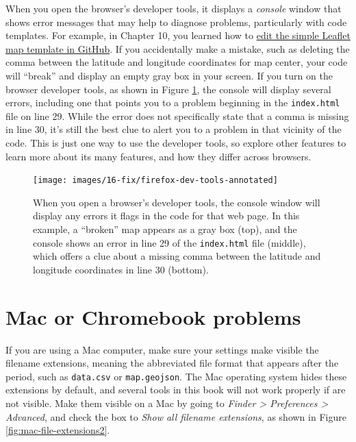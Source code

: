 \documentclass[
  english,
]{book}
\begin{document}
When you open the browser's developer tools, it displays a \emph{console} window that shows error messages that may help to diagnose problems, particularly with code templates. For example, in Chapter 10, you learned how to \href{copy-leaflet.html}{edit the simple Leaflet map template in GitHub}. If you accidentally make a mistake, such as deleting the comma between the latitude and longitude coordinates for map center, your code will ``break'' and display an empty gray box in your screen. If you turn on the browser developer tools, as shown in Figure \ref{fig:firefox-dev-tools}, the console will display several errors, including one that points you to a problem beginning in the \texttt{index.html} file on line 29. While the error does not specifically state that a comma is missing in line 30, it's still the best clue to alert you to a problem in that vicinity of the code. This is just one way to use the developer tools, so explore other features to learn more about its many features, and how they differ across browsers.



\begin{figure}
\texttt{[image: images/16-fix/firefox-dev-tools-annotated]} \caption{When you open a browser's developer tools, the console window will display any errors it flags in the code for that web page. In this example, a ``broken'' map appears as a gray box (top), and the console shows an error in line 29 of the \texttt{index.html} file (middle), which offers a clue about a missing comma between the latitude and longitude coordinates in line 30 (bottom).}\label{fig:firefox-dev-tools}
\end{figure}

\hypertarget{fix-computer}{%
\section{Mac or Chromebook problems}\label{fix-computer}}

If you are using a Mac computer, make sure your settings make visible the filename extensions, meaning the abbreviated file format that appears after the period, such as \texttt{data.csv} or \texttt{map.geojson}. The Mac operating system hides these extensions by default, and several tools in this book will not work properly if are not visible. Make them visible on a Mac by going to \emph{Finder \textgreater{} Preferences \textgreater{} Advanced}, and check the box to \emph{Show all filename extensions}, as shown in Figure \ref{fig:mac-file-extensions2}.
\end{document}
